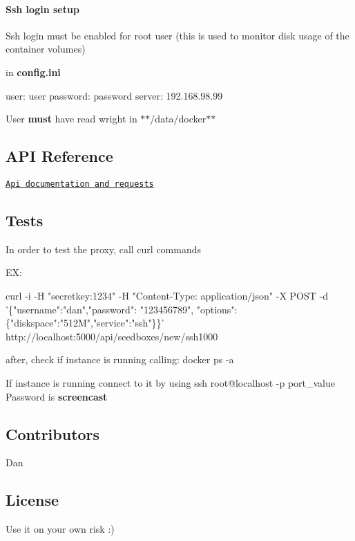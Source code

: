 \paragraph*{Ssh login setup}

Ssh login must be enabled for root user (this is used to monitor disk usage of the container volumes)

in {\bfseries config.\+ini}


\begin{DoxyCode}
[ssh]
user: user
password: password
server: 192.168.98.99
\end{DoxyCode}


User {\bfseries must} have read wright in $\ast$$\ast$/data/docker$\ast$$\ast$

\subsection*{A\+PI Reference}

\href{https://docs.google.com/spreadsheets/d/1dNXysy8pBEoM8M0qyzARihbboUXdAt57Yh3Idn2TWXc/edit?pli=1#gid=0}{\tt Api documentation and requests}

\subsection*{Tests}

In order to test the proxy, call curl commands

EX\+:


\begin{DoxyCode}
curl -i -H "secretkey:1234" -H "Content-Type: application/json" -X POST -d '\{"username":"dan","password":
       "123456789", "options": \{"diskspace":"512M","service":"ssh"\}\}'
       http://localhost:5000/api/seedboxes/new/ssh1000
\end{DoxyCode}


after, check if instance is running calling\+: {\ttfamily docker ps -\/a}

If instance is running connect to it by using {\ttfamily ssh root@localhost -\/p port\+\_\+value} Password is {\bfseries screencast}

\subsection*{Contributors}

Dan

\subsection*{License}

Use it on your own risk \+:) 